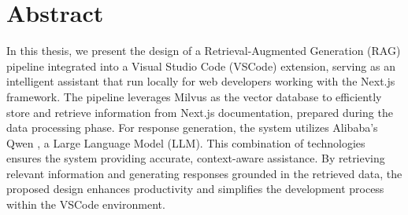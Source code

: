 \chapter*{Abstract}

In this thesis, we present the design of a Retrieval-Augmented Generation (RAG) pipeline integrated into a Visual Studio Code (VSCode) extension, serving as an intelligent assistant that run locally for web developers working with the Next.js framework. The pipeline leverages Milvus \cite{wang2021milvus} as the vector database to efficiently store and retrieve information from Next.js documentation, prepared during the data processing phase. For response generation, the system utilizes Alibaba's Qwen \cite{bai2023qwen}, a Large Language Model (LLM). This combination of technologies ensures the system providing accurate, context-aware assistance. By retrieving relevant information and generating responses grounded in the retrieved data, the proposed design enhances productivity and simplifies the development process within the VSCode environment.

